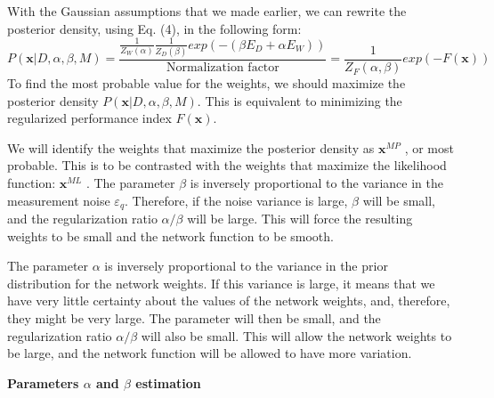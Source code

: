 \documentclass[a4paper, 12pt, english, parskip]{scrartcl}
\begin{document}
With the Gaussian assumptions that we made earlier, we can rewrite the posterior density, using Eq. (4), in the following form:
\begin{equation}
    P(\boldsymbol{x} \vert D, \alpha, \beta, M) = \frac{\frac{1}{Z_W(\alpha)}\frac{1}{Z_D(\beta)}exp(-(\beta E_D + \alpha E_W))}{\text{Normalization factor}} = \frac{1}{Z_F(\alpha, \beta)}exp(-F(\boldsymbol{x}))
\end{equation}
To find the most probable value for the weights, we should maximize the posterior density $P(\boldsymbol{x} \vert D, \alpha, \beta, M)$. This is equivalent to minimizing the regularized performance index $F(\boldsymbol{x})$.

We will identify the weights that maximize the posterior density as $\boldsymbol{x}^{MP}$ , or most probable. This is to be contrasted with the weights that maximize the likelihood function: $\boldsymbol{x}^{ML}$ .
The parameter $\beta$ is inversely proportional to the variance in the measurement noise $\varepsilon_q$. Therefore, if the noise variance is large, $\beta$ will be small, and the regularization ratio $\alpha / \beta $ will be large. This will force the resulting weights to be small and the network function to be smooth.

The parameter $\alpha$ is inversely proportional to the variance in the prior distribution for the network weights. If this variance is large, it means that we have very little certainty about the values of the network weights, and, therefore, they might be very large. The parameter will then be small, and the regularization ratio $\alpha / \beta $ will also be small. This will allow the network weights to be large, and the network function will be allowed to have more variation. 

\textbf{Parameters $\alpha$ and $\beta$ estimation}
\end{document}
